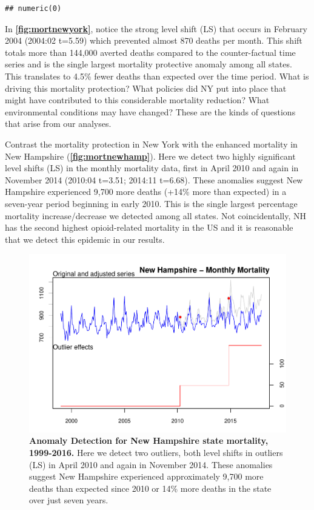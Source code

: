 \documentclass[12pt]{article}
\begin{document}
\begin{verbatim}
## numeric(0)
\end{verbatim}

In \textbf{\autoref{fig:mortnewyork}}, notice the strong level shift
(LS) that occurs in February 2004 (2004:02 t=5.59) which prevented
almost 870 deaths per month. This shift totals more than 144,000 averted
deaths compared to the counter-factual time series and is the single
largest mortality protective anomaly among all states. This translates
to 4.5\% fewer deaths than expected over the time period. What is
driving this mortality protection? What policies did NY put into place
that might have contributed to this considerable mortality reduction?
What environmental conditions may have changed? These are the kinds of
questions that arise from our analyses.

Contrast the mortality protection in New York with the enhanced
mortality in New Hampshire (\textbf{\autoref{fig:mortnewhamp}}). Here we
detect two highly significant level shifts (LS) in the monthly mortality
data, first in April 2010 and again in November 2014 (2010:04 t=3.51;
2014:11 t=6.68). These anomalies suggest New Hampshire experienced 9,700
more deaths (+14\% more than expected) in a seven-year period beginning
in early 2010. This is the single largest percentage mortality
increase/decrease we detected among all states. Not coincidentally, NH
has the second highest opioid-related mortality in the US
\citep{beetham2019access} and it is reasonable that we detect this
epidemic in our results.

\begin{figure}
\centering
\includegraphics{manuscript_files/figure-latex/MortalityNewHamp-1.pdf}
\caption{\textbf{Anomaly Detection for New Hampshire state mortality, 1999-2016.}
Here we detect two outliers, both level shifts in outliers (LS) in April
2010 and again in November 2014. These anomalies suggest New Hampshire
experienced approximately 9,700 more deaths than expected since 2010 or
14\% more deaths in the state over just seven years.
\label{fig:mortnewhamp}}
\end{figure}
\end{document}
